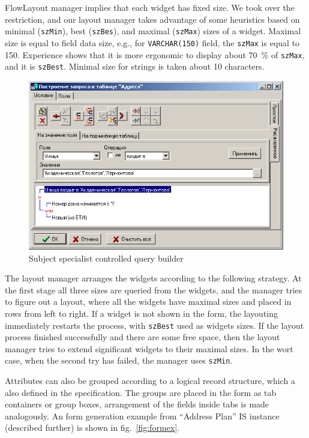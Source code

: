 \documentclass[conference]{IEEEtran}
\begin{document}
FlowLayout manager implies that each widget has fixed size.  We took over the restriction, and our layout manager takes advantage of some heuristics based on minimal (\texttt{szMin}), best (\texttt{szBes}), and maximal (\texttt{szMax}) sizes of a widget.  Maximal size is equal to field data size, e.g., for \texttt{VARCHAR(150)} field, the \texttt{szMax} is equal to 150.  Experience shows that it is more ergonomic to display about 70~\% of \texttt{szMax}, and it is \texttt{szBest}.  Minimal size for strings is taken about 10 characters.

\begin{figure}[t]
  \centering
  \includegraphics[width=\linewidth]{qbuilder.png}
  \caption{Subject specialist controlled query builder}
  \label{fig:qbuilder}
\end{figure}

The layout manager arranges the widgets according to the following strategy.  At the first stage all three sizes are queried from the widgets, and the manager tries to figure out a layout, where all the widgets have maximal sizes and placed in rows from left to right.  If a widget is not shown in the form, the layouting immediately restarts the process, with \texttt{szBest} used as widgets sizes.  If the layout process finished successfully and there are some free space, then the layout manager tries to extend significant widgets to their maximal sizes.  In the wort case, when the second try has failed, the manager uses \texttt{szMin}.

Attributes can also be grouped according to a logical record structure, which a also defined in the specification.  The groups are placed in the form as tab containers or group boxes, arrangement of the fields inside tabs is made analogously.  An form generation example from ``Address Plan'' IS instance (described further) is shown in fig.~\ref{fig:formex}.
\end{document}

